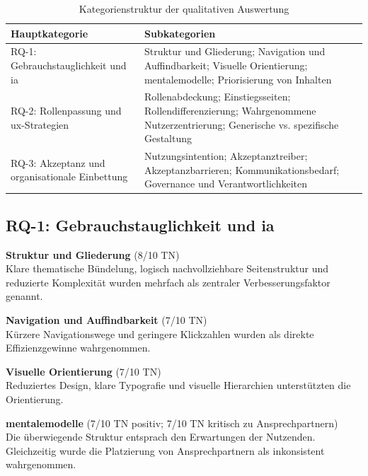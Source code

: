 \begin{table}[H]
  \centering
  \caption{Kategorienstruktur der qualitativen Auswertung}
  \label{tab:BB-category-overview}
  \begin{tabular}{p{6cm} p{9cm}}
    \toprule
    Hauptkategorie                                          & Subkategorien                                                         \\
    \midrule
    RQ-1: Gebrauchstauglichkeit und \Gls{ia} &
    Struktur und Gliederung; Navigation und Auffindbarkeit; Visuelle Orientierung; \Gls{mentalemodelle}; Priorisierung von Inhalten      \\
    RQ-2: Rollenpassung und \Gls{ux}-Strategien                   &
    Rollenabdeckung; Einstiegsseiten; Rollendifferenzierung; Wahrgenommene Nutzerzentrierung; Generische vs. spezifische Gestaltung \\
    RQ-3: Akzeptanz und organisationale Einbettung          &
    Nutzungsintention; Akzeptanztreiber; Akzeptanzbarrieren; Kommunikationsbedarf; Governance und Verantwortlichkeiten              \\
    \bottomrule
  \end{tabular}
\end{table}

\newpage
\subsection{RQ-1: Gebrauchstauglichkeit und \Gls{ia}}

\textbf{Struktur und Gliederung} (8/10 TN) \\
Klare thematische Bündelung, logisch nachvollziehbare Seitenstruktur und reduzierte Komplexität wurden mehrfach als zentraler Verbesserungsfaktor genannt.

\textbf{Navigation und Auffindbarkeit} (7/10 TN) \\
Kürzere Navigationswege und geringere Klickzahlen wurden als direkte Effizienzgewinne wahrgenommen.

\textbf{Visuelle Orientierung} (7/10 TN) \\
Reduziertes Design, klare Typografie und visuelle Hierarchien unterstützten die Orientierung.

\textbf{\Gls{mentalemodelle}} (7/10 TN positiv; 7/10 TN kritisch zu Ansprechpartnern) \\
Die überwiegende Struktur entsprach den Erwartungen der Nutzenden. Gleichzeitig wurde die Platzierung von Ansprechpartnern als inkonsistent wahrgenommen.


